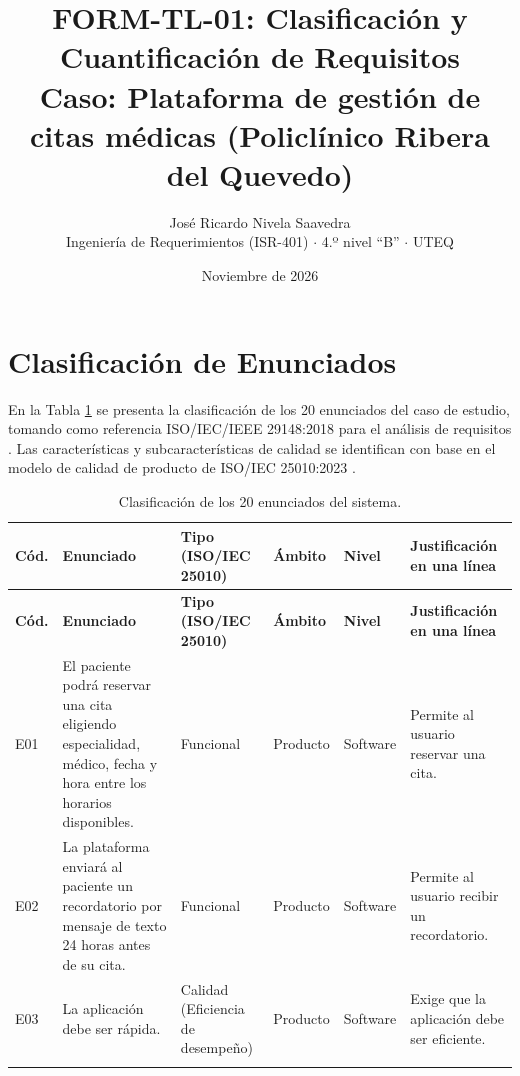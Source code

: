 \documentclass[10pt,a4paper]{article}
\title{\textbf{FORM-TL-01: Clasificación y Cuantificación de Requisitos}\\
	\large Caso: Plataforma de gestión de citas médicas (Policlínico Ribera del Quevedo)}
\author{José Ricardo Nivela Saavedra \\ \small Ingeniería de Requerimientos (ISR-401) $\cdot$ 4.º nivel ``B'' $\cdot$ UTEQ}
\date{Noviembre de 2026}
\begin{document}
	
	\maketitle

\section{Clasificación de Enunciados}
	
	En la Tabla \ref{tab:clasificacion} se presenta la clasificación de los 20 enunciados del caso de estudio, tomando como referencia ISO/IEC/IEEE 29148:2018 para el análisis de requisitos \cite{ieee29148}. Las características y subcaracterísticas de calidad se identifican con base en el modelo de calidad de producto de ISO/IEC 25010:2023 \cite{iso25010}.
	
	\small
	\begin{longtable}{@{}>{\raggedright\arraybackslash}p{0.8cm}>{\raggedright\arraybackslash}p{3.2cm}>{\raggedright\arraybackslash}p{2.2cm}>{\raggedright\arraybackslash}p{1.5cm}>{\raggedright\arraybackslash}p{1.3cm}>{\raggedright\arraybackslash}p{5.8cm}@{}}
		\caption{Clasificación de los 20 enunciados del sistema.} \label{tab:clasificacion} \\
		\toprule
		\textbf{Cód.} & \textbf{Enunciado} & \textbf{Tipo (ISO/IEC 25010)} & \textbf{Ámbito} & \textbf{Nivel} & \textbf{Justificación en una línea} \\
		\midrule
		\endfirsthead
		\toprule
		\textbf{Cód.} & \textbf{Enunciado} & \textbf{Tipo (ISO/IEC 25010)} & \textbf{Ámbito} & \textbf{Nivel} & \textbf{Justificación en una línea} \\
		\midrule
		\endhead
		\bottomrule
		\endfoot
		
		E01 & El paciente podrá reservar una cita eligiendo especialidad, médico, fecha y hora entre los horarios disponibles. & Funcional & Producto & Software & Permite al usuario reservar una cita. \\ \addlinespace
		
		E02 & La plataforma enviará al paciente un recordatorio por mensaje de texto 24 horas antes de su cita. & Funcional & Producto & Software & Permite al usuario recibir un recordatorio. \\ \addlinespace
		
		E03 & La aplicación debe ser rápida. & Calidad (Eficiencia de desempeño) & Producto & Software & Exige que la aplicación debe ser eficiente. \\ \addlinespace
		

\end{longtable}
\end{document}
